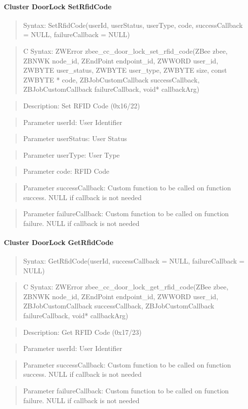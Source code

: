 \paragraph{Cluster DoorLock SetRfidCode}
\begin{quote}Syntax: SetRfidCode(userId, userStatus, userType, code, successCallback = NULL, failureCallback = NULL)\end{quote}
\begin{quote}C Syntax: ZWError zbee\_cc\_door\_lock\_set\_rfid\_code(ZBee zbee, ZBNWK node\_id, ZEndPoint endpoint\_id, ZWWORD user\_id, ZWBYTE user\_status, ZWBYTE user\_type, ZWBYTE size, const ZWBYTE * code, ZBJobCustomCallback successCallback, ZBJobCustomCallback failureCallback, void* callbackArg)\end{quote}
\begin{quote}Description: Set RFID Code (0x16/22)\end{quote}
\begin{quote}Parameter userId: User Identifier\end{quote}
\begin{quote}Parameter userStatus: User Status\end{quote}
\begin{quote}Parameter userType: User Type\end{quote}
\begin{quote}Parameter code: RFID Code\end{quote}
\begin{quote}Parameter successCallback: Custom function to be called on function success. NULL if callback is not needed\end{quote}
\begin{quote}Parameter failureCallback: Custom function to be called on function failure. NULL if callback is not needed\end{quote}


\paragraph{Cluster DoorLock GetRfidCode}
\begin{quote}Syntax: GetRfidCode(userId, successCallback = NULL, failureCallback = NULL)\end{quote}
\begin{quote}C Syntax: ZWError zbee\_cc\_door\_lock\_get\_rfid\_code(ZBee zbee, ZBNWK node\_id, ZEndPoint endpoint\_id, ZWWORD user\_id, ZBJobCustomCallback successCallback, ZBJobCustomCallback failureCallback, void* callbackArg)\end{quote}
\begin{quote}Description: Get RFID Code (0x17/23)\end{quote}
\begin{quote}Parameter userId: User Identifier\end{quote}
\begin{quote}Parameter successCallback: Custom function to be called on function success. NULL if callback is not needed\end{quote}
\begin{quote}Parameter failureCallback: Custom function to be called on function failure. NULL if callback is not needed\end{quote}


